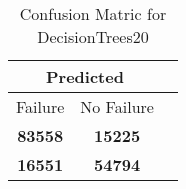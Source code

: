 \begin{table}[] 
\caption{Confusion Matric for DecisionTrees20} 
\label{Table: Prediction Accuracy-DMDDecisionTrees20OnlySunEKF-ignoreReflection100.9EKF-top2-Reflection} 
\centering 
\begin{tabular} 
 {@{}ccc@{}} 
\toprule 
\multicolumn{2}{c}{\textbf{Predicted}}
 \\ \midrule 
\multicolumn{1}{|c|}{Failure} & 
\multicolumn{1}{c|}{No Failure}
 \\ \midrule 
\multicolumn{1}{|c|}{\color{green}\textbf{83558}} & 
\multicolumn{1}{c|}{\color{red}\textbf{15225}}
 \\ \midrule 
\multicolumn{1}{|c|}{\color{red}\textbf{16551}} & 
\multicolumn{1}{c|}{\color{green}\textbf{54794}}
 \\ \bottomrule 
\end{tabular} 
\end{table} 
